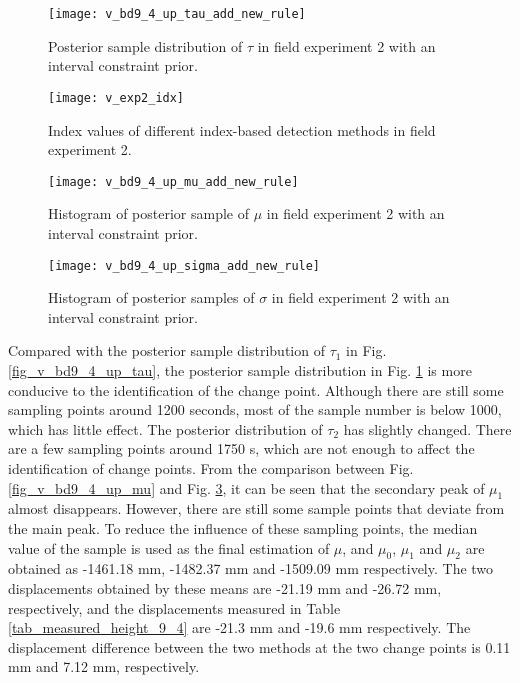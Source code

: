 \documentclass[final,3p,times]{elsarticle}
\begin{document}
	\begin{figure}[htbp]
		\centering
		\texttt{[image: v\_bd9\_4\_up\_tau\_add\_new\_rule]}
		\caption{Posterior sample distribution of $\tau$ in field experiment 2 with an interval constraint prior.}
		\label{fig_v_bd9_4_up_tau_add_new_rule}
	\end{figure} 
	\begin{figure}[htbp]
	\centering
	\texttt{[image: v\_exp2\_idx]}
	\caption{Index values of different index-based detection methods in field experiment 2.}
	\label{fig_v_exp2_idx}
	\end{figure} 
	\begin{figure}[htbp]
		\centering
		\texttt{[image: v\_bd9\_4\_up\_mu\_add\_new\_rule]}
		\caption{Histogram of posterior sample of $\mu$ in field experiment 2 with an interval constraint prior.}
		\label{fig_v_bd9_4_up_mu_add_new_rule}
	\end{figure} 
	\begin{figure}[htbp]
		\centering
		\texttt{[image: v\_bd9\_4\_up\_sigma\_add\_new\_rule]}
		\caption{Histogram of posterior \textcolor{r_s}{samples} of $\sigma$ in field experiment 2 with an interval constraint prior.}
		\label{fig_v_bd9_4_up_sigma_add_new_rule}
	\end{figure}
	Compared with the posterior sample distribution of $\tau_1$ in Fig. \ref{fig_v_bd9_4_up_tau}, the posterior sample distribution in Fig. \ref{fig_v_bd9_4_up_tau_add_new_rule} is more conducive to the identification of the change point.
	Although there are still some sampling points around 1200 seconds, most of the sample number is below 1000, which has little effect.
	The posterior distribution of $\tau_2$ has slightly changed. 
	There are a few sampling points around 1750 s, which are not enough to affect the identification of change points.
	From the comparison between Fig. \ref{fig_v_bd9_4_up_mu} and Fig. \ref{fig_v_bd9_4_up_mu_add_new_rule}, it can be seen that the secondary peak of $\mu_1$ almost disappears.
	However, there are still some sample points \textcolor{r_s}{that} deviate from the main peak.
	To reduce the influence of these sampling points, the median value of the sample is used as the final estimation of \textbf{$\mu$}, and $\mu_0$, $\mu_1$ and $\mu_2$ are obtained as -1461.18 mm, -1482.37 mm and -1509.09 mm respectively.
	The two displacements obtained by these means are -21.19 mm and -26.72 mm, respectively, and the displacements measured in Table \ref{tab_measured_height_9_4} are -21.3 mm and -19.6 mm respectively.  
	The displacement difference between the two methods at the two change points is 0.11 mm and 7.12 mm, respectively. 
\end{document}
